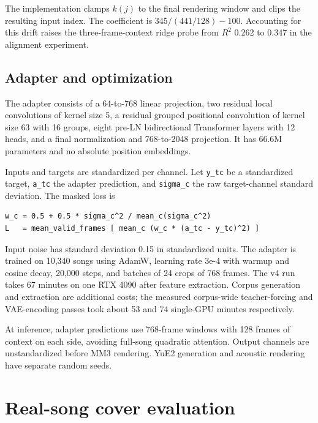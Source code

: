 \documentclass[11pt,a4paper]{article}
\newcommand{\code}[1]{\texttt{#1}}
\begin{document}
The implementation clamps $k(j)$ to the final rendering window and clips the resulting input index. The coefficient is $345 / (441/128) - 100$. Accounting for this drift raises the three-frame-context ridge probe from $R^2$ 0.262 to 0.347 in the alignment experiment.

\subsection{Adapter and optimization}

The adapter consists of a 64-to-768 linear projection, two residual local convolutions of kernel size 5, a residual grouped positional convolution of kernel size 63 with 16 groups, eight pre-LN bidirectional Transformer layers with 12 heads, and a final normalization and 768-to-2048 projection. It has 66.6M parameters and no absolute position embeddings.

Inputs and targets are standardized per channel. Let \code{y\_tc} be a standardized target, \code{a\_tc} the adapter prediction, and \code{sigma\_c} the raw target-channel standard deviation. The masked loss is

\begin{Verbatim}[frame=single,fontsize=\small,samepage=true,xleftmargin=1em,xrightmargin=1em]
w_c = 0.5 + 0.5 * sigma_c^2 / mean_c(sigma_c^2)
L   = mean_valid_frames [ mean_c (w_c * (a_tc - y_tc)^2) ]
\end{Verbatim}

Input noise has standard deviation 0.15 in standardized units. The adapter is trained on 10,340 songs using AdamW, learning rate 3e-4 with warmup and cosine decay, 20,000 steps, and batches of 24 crops of 768 frames. The v4 run takes 67 minutes on one RTX 4090 after feature extraction. Corpus generation and extraction are additional costs; the measured corpus-wide teacher-forcing and VAE-encoding passes took about 53 and 74 single-GPU minutes respectively.

At inference, adapter predictions use 768-frame windows with 128 frames of context on each side, avoiding full-song quadratic attention. Output channels are unstandardized before MM3 rendering. YuE2 generation and acoustic rendering have separate random seeds.

\section{Real-song cover evaluation}
\label{sec:eval}
\end{document}
